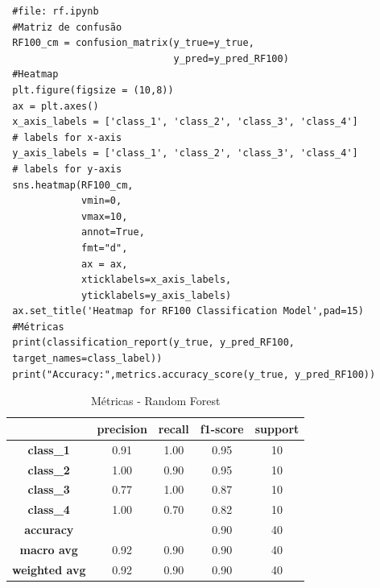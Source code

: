 \documentclass[
	article,			%
	11pt,				%
	oneside,			%
	a4paper,			%
	english,			%
	brazil,				%
	sumario=tradicional
	]{abntex2}
\begin{document}
\begin{verbatim}
 #file: rf.ipynb
 #Matriz de confusão
 RF100_cm = confusion_matrix(y_true=y_true, 
                             y_pred=y_pred_RF100)
 #Heatmap
 plt.figure(figsize = (10,8))
 ax = plt.axes()
 x_axis_labels = ['class_1', 'class_2', 'class_3', 'class_4'] 
 # labels for x-axis
 y_axis_labels = ['class_1', 'class_2', 'class_3', 'class_4'] 
 # labels for y-axis
 sns.heatmap(RF100_cm,
             vmin=0,
             vmax=10,
             annot=True,
             fmt="d",
             ax = ax,
             xticklabels=x_axis_labels, 
             yticklabels=y_axis_labels)
 ax.set_title('Heatmap for RF100 Classification Model',pad=15)
 #Métricas
 print(classification_report(y_true, y_pred_RF100,
 target_names=class_label))
 print("Accuracy:",metrics.accuracy_score(y_true, y_pred_RF100))
\end{verbatim}


\begin{table}[H]
\centering
\begin{tabular}{c|c|c|c|c|}
\cline{2-5}
                                            & \textbf{precision} & \textbf{recall} & \textbf{f1-score} & \textbf{support} \\ \hline
\multicolumn{1}{|c|}{\textbf{class\_1}}     & 0.91               & 1.00            & 0.95              & 10               \\ \hline
\multicolumn{1}{|c|}{\textbf{class\_2}}     & 1.00               & 0.90            & 0.95              & 10               \\ \hline
\multicolumn{1}{|c|}{\textbf{class\_3}}     & 0.77               & 1.00            & 0.87              & 10               \\ \hline
\multicolumn{1}{|c|}{\textbf{class\_4}}     & 1.00               & 0.70            & 0.82              & 10               \\ \hline
\multicolumn{1}{|c|}{\textbf{accuracy}}     &                    &                 & 0.90              & 40               \\ \hline
\multicolumn{1}{|c|}{\textbf{macro avg}}    & 0.92               & 0.90            & 0.90              & 40               \\ \hline
\multicolumn{1}{|c|}{\textbf{weighted avg}} & 0.92               & 0.90            & 0.90              & 40               \\ \hline
\end{tabular}
\caption{Métricas - Random Forest }
\label{tab:rf_01}
\end{table}
\end{document}
